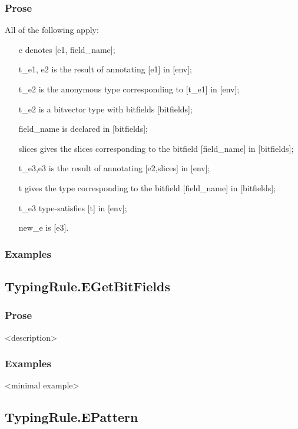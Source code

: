 \documentclass{book}
\begin{document}
  \subsubsection{Prose}
  All of the following apply:
  \begin{itemize}
  \item  [e] denotes [e1, field\_name];
  \item  [t\_e1, e2] is the result of annotating [e1] in [env];
  \item  [t\_e2] is the anonymous type corresponding to [t\_e1] in [env];
  \item  [t\_e2] is a bitvector type with bitfields [bitfields];
  \item  [field\_name] is declared in [bitfields];
  \item  [slices] gives the slices corresponding to the bitfield [field\_name] in
    [bitfields];
  \item  [t\_e3,e3] is the result of annotating [e2,slices] in [env];
  \item  [t] gives the type corresponding to the bitfield [field\_name] in [bitfields];
  \item  [t\_e3] type-satisfies [t] in [env];
  \item  [new\_e] is [e3].
  \end{itemize}

  \subsubsection{Examples}

\subsection{TypingRule.EGetBitFields}

  \subsubsection{Prose}
  <description>

  \subsubsection{Examples}
  <minimal example>

\subsection{TypingRule.EPattern}
\end{document}
